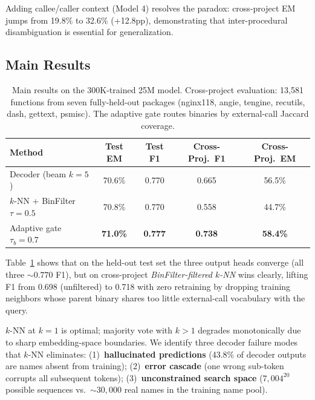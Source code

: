 \documentclass[sigconf,nonacm]{acmart}
\begin{document}
Adding callee/caller context (Model 4) resolves the paradox: cross-project EM jumps from 19.8\% to 32.6\% (+12.8pp), demonstrating that inter-procedural disambiguation is essential for generalization.

\subsection{Main Results}
\label{sec:main}

\begin{table}[t]
    \centering
    \caption{Main results on the 300K-trained 25M model. Cross-project evaluation: 13{,}581 functions from seven fully-held-out packages (nginx118, angie, tengine, recutils, dash, gettext, psmisc). The adaptive gate routes binaries by external-call Jaccard coverage.}
    \label{tab:main}
    \footnotesize
    \setlength{\tabcolsep}{3pt}
    \begin{tabular}{@{}lcccc@{}}
        \toprule
        \textbf{Method} & \textbf{Test EM} & \textbf{Test F1} & \textbf{Cross-Proj.\ F1} & \textbf{Cross-Proj.\ EM} \\
        \midrule
        Decoder (beam $k{=}5$)          & 70.6\% & 0.770 & 0.665 & 56.5\% \\
        $k$-NN + BinFilter $\tau{=}0.5$ & 70.8\% & 0.770 & 0.558 & 44.7\% \\
        Adaptive gate $\tau_b{=}0.7$    & \textbf{71.0\%} & \textbf{0.777} & \textbf{0.738} & \textbf{58.4\%} \\
        \bottomrule
    \end{tabular}
\end{table}

Table~\ref{tab:main} shows that on the held-out test set the three output heads converge (all three ${\sim}0.770$ F1), but on cross-project \emph{BinFilter-filtered $k$-NN} wins clearly, lifting F1 from 0.698 (unfiltered) to 0.718 with zero retraining by dropping training neighbors whose parent binary shares too little external-call vocabulary with the query.

$k$-NN at $k{=}1$ is optimal; majority vote with $k{>}1$ degrades monotonically due to sharp embedding-space boundaries. We identify three decoder failure modes that $k$-NN eliminates: (1)~\textbf{hallucinated predictions} (43.8\% of decoder outputs are names absent from training); (2)~\textbf{error cascade} (one wrong sub-token corrupts all subsequent tokens); (3)~\textbf{unconstrained search space} ($7{,}004^{20}$ possible sequences vs.\ ${\sim}30{,}000$ real names in the training name pool).
\end{document}
